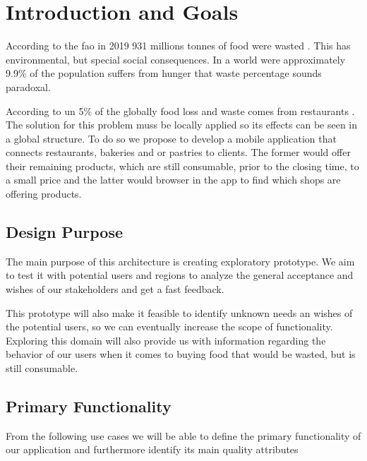 \section{Introduction and Goals}

According to the \acrfull{fao} in 2019 931 millions tonnes of food were wasted \cite{refart:FAOFW}. This has
environmental, but special social consequences. In a world were approximately 9.9\% of the \cite{refart:AAHWH}
population suffers from hunger that waste percentage sounds paradoxal.

According to \acrfull{un} 5\% of the globally food loss and waste comes from restaurants \cite{refart:UNSP}. 
The solution for this problem muss be locally applied so its effects can be seen in a global structure. To do so we
propose to develop a mobile application that connects restaurants, bakeries and or pastries to clients. 
The former would offer their remaining products, which are still consumable, prior to the closing time, to a small price 
and the latter would browser in the app to find which shops are offering products. 

 
\subsection{Design Purpose}

The main purpose of this architecture is creating exploratory prototype. We aim to test it with potential users and
regions to analyze the general acceptance and wishes of our stakeholders \cite{refbook:DSHC} and get a fast feedback. 

This prototype will also make it feasible to identify unknown needs an wishes of the potential users, so we can eventually
increase the scope of functionality. Exploring this domain will also provide us with information regarding the behavior 
of our users when it comes to buying food that would be wasted, but is still consumable.

\subsection{Primary Functionality}

From the following use cases we will be able to define the primary functionality of our application and 
furthermore identify its main quality attributes 


